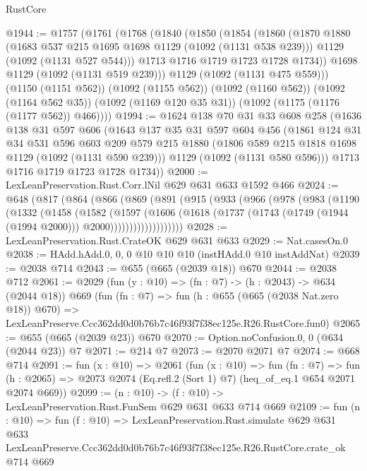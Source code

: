 \begin{lexlean}{RustCore}
\begin{coremodule}
@1944 := @1757
    (@1761
      (@1768
        (@1840
          (@1850
            (@1854
              (@1860
                (@1870
                  @1880
                  (@1683 @537 @215 @1695 @1698 @1129 (@1092 (@1131 @538 @239)))
                  @1129
                  (@1092 (@1131 @527 @544)))
                @1713
                @1716
                @1719
                @1723
                @1728
                @1734))
            @1698
            @1129
            (@1092 (@1131 @519 @239)))
          @1129
          (@1092 (@1131 @475 @559)))
        (@1150 (@1151 @562))
        (@1092 (@1155 @562))
        (@1092 (@1160 @562))
        (@1092 (@1164 @562 @35))
        (@1092 (@1169 @120 @35 @31))
        (@1092 (@1175 (@1176 (@1177 @562)) @466))))
@1994 := @1624
    @138
    @70
    @31
    @33
    @608
    @258
    (@1636
      @138
      @31
      @597
      @606
      (@1643
        @137
        @35
        @31
        @597
        @604
        @456
        (@1861
          @124
          @31
          @34
          @531
          @596
          @603
          @209
          @579
          @215
          @1880
          (@1806 @589 @215 @1818 @1698 @1129 (@1092 (@1131 @590 @239)))
          @1129
          (@1092 (@1131 @580 @596)))
        @1713
        @1716
        @1719
        @1723
        @1728
        @1734))
@2000 := LexLeanPreservation.Rust.Corr.lNil @629 @631 @633 @1592 @466
@2024 := @648
    (@817
      (@864
        (@866
          (@869
            (@891
              (@915
                (@933
                  (@966
                    (@978
                      (@983
                        (@1190
                          (@1332
                            (@1458
                              (@1582
                                (@1597
                                  (@1606
                                    (@1618
                                      (@1737
                                        (@1743
                                          (@1749 (@1944 (@1994 @2000)))
                                          @2000)))))))))))))))))))
@2028 := LexLeanPreservation.Rust.CrateOK @629 @631 @633
@2029 := Nat.casesOn.{0}
@2038 := HAdd.hAdd.{0, 0, 0} @10 @10 @10 (instHAdd.{0} @10 instAddNat)
@2039 := @2038 @714
@2043 := @655 (@665 (@2039 @18)) @670
@2044 := @2038 @712
@2061 := @2029
    (fun (y : @10) => (fn : @7) -> (h : @2043) -> @634 (@2044 @18))
    @669
    (fun (fn : @7) =>
    fun (h : @655 (@665 (@2038 Nat.zero @18)) @670) =>
    LexLeanPreserve.Ccc362dd0d0b76b7c46f93f7f38ec125e.R26.RustCore.fun0)
@2065 := @655 (@665 (@2039 @23)) @670
@2070 := Option.noConfusion.{0, 0} (@634 (@2044 @23)) @7
@2071 := @214 @7
@2073 := @2070 @2071 @7
@2074 := @668 @714
@2091 := fun (x : @10) =>
  @2061
    (fun (x : @10) =>
    fun (fn : @7) =>
    fun (h : @2065) => @2073 @2074 (Eq.refl.{2} (Sort 1) @7) (heq_of_eq.{1} @654 @2071 @2074 @669))
@2099 := (n : @10) -> (f : @10) -> LexLeanPreservation.Rust.FunSem @629 @631 @633 @714 @669
@2109 := fun (n : @10) =>
  fun (f : @10) =>
  LexLeanPreservation.Rust.simulate
    @629
    @631
    @633
    LexLeanPreserve.Ccc362dd0d0b76b7c46f93f7f38ec125e.R26.RustCore.crate_ok
    @714
    @669
\end{coremodule}
\end{lexlean}
